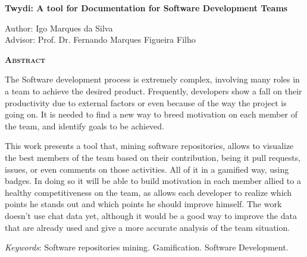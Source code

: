 \begin{center}
	{\Large{\textbf{Twydi: A tool for Documentation for Software Development Teams}}}
\end{center}

\vspace{1cm}

\begin{flushright}
	Author: Igo Marques da Silva\\
	Advisor: Prof. Dr. Fernando Marques Figueira Filho
\end{flushright}

\vspace{1cm}

\begin{center}
	\Large{\textsc{\textbf{Abstract}}}
\end{center}

\noindent The Software development process is extremely complex, involving many roles in a team to achieve the desired product. Frequently, developers show a fall on their productivity due to external factors or even because of the way the project is going on. It is needed to find a new way to breed motivation on each member of the team, and identify goals to be achieved.

\noindent
This work presents a tool that, mining software repositories, allows to visualize the best members of the team based on their contribution, being it pull requests, issues, or even comments on those activities. All of it in a gamified way, using badges. In doing so it will be able to build motivation in each member allied to a healthy competitiveness on the team, as allows each developer to realize which points he stands out and which points he should improve himself. The work doesn't use chat data yet, although it would be a good way to improve the data that are already used and give a more accurate analysis of the team situation.

\noindent\textit{Keywords}: Software repositories mining. Gamification. Software Development.

